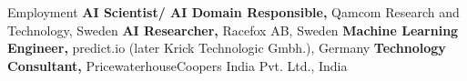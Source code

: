 \begin{rubric}{Employment}
\entry*[2021 -- present]%
	\textbf{AI Scientist/ AI Domain Responsible,} Qamcom Research and Technology, Sweden
%
\entry*[2020 -- 2021]%
	\textbf{AI Researcher,} Racefox AB, Sweden
%
\entry*[2017 -- 2019]%
	\textbf{Machine Learning Engineer,} predict.io (later Krick Technologic Gmbh.), Germany
%
\entry*[2012 -- 2015]%
	\textbf{Technology Consultant,} PricewaterhouseCoopers India Pvt. Ltd., India
%
\end{rubric}

